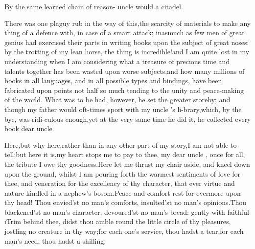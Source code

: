 \documentclass[twoside]{article}
\begin{document}
By the same learned chain of reason-
uncle \toby would a citadel.

There was one plaguy rub in the way of this,\tsh the
scarcity of materials to make any thing of a defence with, in
case
of a smart attack; inasmuch as few men of great genius had
exercised their parts in writing books upon the subject of\break 
great noses: by the trotting of my lean horse, the thing is
incredible!\@  and I am quite lost in my understanding when I am
considering what a treasure of precious time and talents
together has been wasted upon worse subjects,\tsk and how many
millions of books in all languages, and in all possible types and
bindings, have been fabricated upon points not half so much
tending to the unity and peace-making of the world.  What was to
be had, however, he set the greater store\break by; and though my
father would oft-times sport with my uncle \toby's
li-\break brary,\tsk which, by the bye, was ridi-\break culous enough,\tsk yet
at the very same time he did it, he collected every book
dear uncle.\tsh

Here,\tsh but why here,\tsh rather than in any
other part of my story,\tsh I am not able to
tell;\tsh but here it is,\tsh my heart stops me to
pay to\break
thee, my dear uncle \toby, once for all, the tribute I
owe thy goodness.\tsh Here\break
let me thrust my chair aside, and kneel\break
down upon the ground, whilst I am\break
pouring forth the warmest sentiments\break
of love for thee, and veneration for\break
the excellency of thy character, that\break
ever virtue and nature kindled in a
nephew’s bosom.\tsh Peace and comfort rest for evermore upon thy
head!\tsk\break
Thou envied’st no man’s comforts,\tsh\break
insulted’st no man’s opinions.\tsh Thou\break
blackened’st no man’s character,\tsh\break
devoured’st no man’s bread: gently\break
with faithful \i{Trim} behind thee, didst\break
thou amble round the little circle of\break
thy pleasures, jostling no creature in\break
thy way;\tsk for each one’s service,\break
thou hadst a tear,\tsk for each man’s\break
need, thou hadst a shilling.
\end{document}
